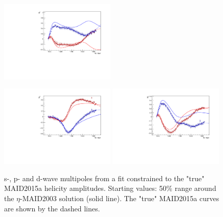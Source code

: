 \documentclass[a4paper,12pt]{report}
\begin{document}
\begin{figure}
\begin{center}
{    \includegraphics[width=0.49\textwidth]{MAID/PenHeli/plots.0/E2m.pdf}
    }
    \centerline{
    \includegraphics[width=0.49\textwidth]{MAID/PenHeli/plots.0/M2p.pdf}
    \includegraphics[width=0.49\textwidth]{MAID/PenHeli/plots.0/M2m.pdf}
    }
    \caption{s-, p- and d-wave multipoles from a fit constrained to the "true" MAID2015a helicity amplitudes. 
    Starting values: 50\% range around the $\eta$-MAID2003 solution (solid line). The "true" MAID2015a curves are
    shown by the dashed lines.}
\label{Fig:const3}
  \end{center}
\end{figure}
\end{document}
